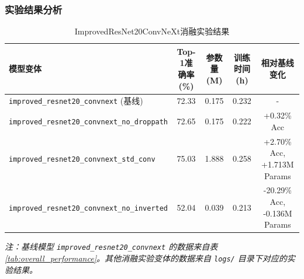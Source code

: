 \documentclass[a4paper]{article}
\begin{document}
\subsubsection{实验结果分析}
\begin{table}[H]
\centering
\caption{ImprovedResNet20ConvNeXt消融实验结果}
\label{tab:improved_ablation_results}
\begin{tabular}{lcccc}
\toprule
\textbf{模型变体} & \textbf{Top-1准确率(\%)} & \textbf{参数量(M)} & \textbf{训练时间(h)} & \textbf{相对基线变化} \\
\midrule
\texttt{improved\_resnet20\_convnext} (基线) & 72.33 & 0.175 & 0.232 & - \\
\texttt{improved\_resnet20\_convnext\_no\_droppath} & 72.65 & 0.175 & 0.222 & +0.32\% Acc \\
\texttt{improved\_resnet20\_convnext\_std\_conv} & 75.03 & 1.888 & 0.258 & +2.70\% Acc, +1.713M Params \\
\texttt{improved\_resnet20\_convnext\_no\_inverted} & 52.04 & 0.039 & 0.213 & -20.29\% Acc, -0.136M Params \\
\bottomrule
\end{tabular}
\end{table}
\textit{注：基线模型 \texttt{improved\_resnet20\_convnext} 的数据来自表\ref{tab:overall_performance}。其他消融实验变体的数据来自 \texttt{logs/} 目录下对应的实验结果。}
\end{document}
